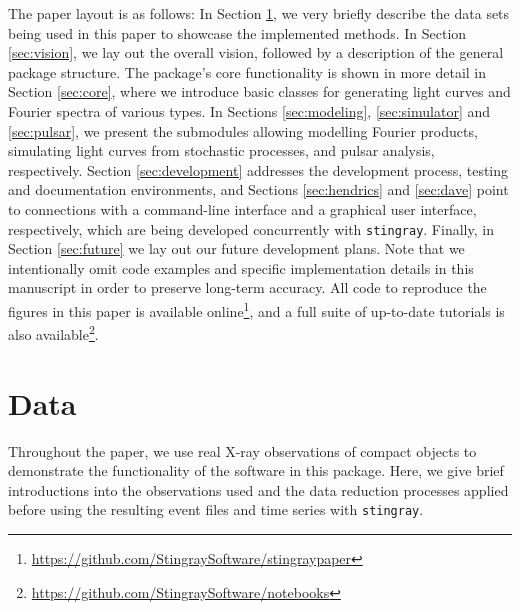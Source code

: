 \documentclass[twocolumn]{aastex62}
\newcommand{\stingray}{\texttt{stingray}\xspace}
\begin{document}
The paper layout is as follows: 
In Section \ref{sec:data}, we very briefly describe the data sets being used in this paper to showcase the implemented methods. In Section \ref{sec:vision}, we lay out the overall vision, followed by a description of the general package structure. The package's core functionality is shown in more detail in Section \ref{sec:core}, where we introduce basic classes for generating light curves and Fourier spectra of various types.
In Sections \ref{sec:modeling}, \ref{sec:simulator} and \ref{sec:pulsar}, we present the submodules allowing modelling Fourier products, simulating light curves from stochastic processes, and pulsar analysis, respectively.
Section \ref{sec:development} addresses the development process, testing and documentation environments, and Sections \ref{sec:hendrics} and \ref{sec:dave} point to connections with a command-line interface and a graphical user interface, respectively, which are being developed concurrently with \stingray. Finally, in Section \ref{sec:future} we lay out our future development plans. 
Note that we intentionally omit code examples and specific implementation details in this manuscript in order to preserve long-term accuracy. All code to reproduce the figures in this paper is available online\footnote{\url{https://github.com/StingraySoftware/stingraypaper}}, and a full suite of up-to-date tutorials is also available\footnote{\url{https://github.com/StingraySoftware/notebooks}}.

\section{Data}
\label{sec:data}
Throughout the paper, we use real X-ray observations of compact objects to demonstrate the functionality of the software in this package. Here, we give brief introductions into the observations used and the data reduction processes applied before using the resulting event files and time series with \stingray.
\end{document}
